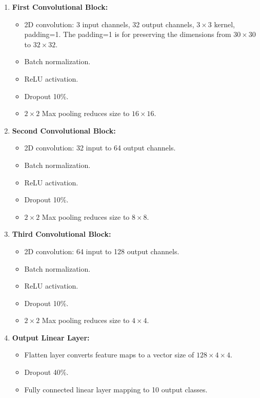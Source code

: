 \documentclass{report}
\begin{document}
\begin{enumerate}
    \item \textbf{First Convolutional Block:}
    \begin{itemize}
        \item 2D convolution: 3 input channels, 32 output channels, $3\times3$ kernel, padding=1. The padding=1 is 
              for preserving the dimensions from $30\times30$ to $32\times32$.
        \item Batch normalization.
        \item ReLU activation.
        \item Dropout 10\%.
        \item $2\times2$ Max pooling reduces size to $16\times16$.
    \end{itemize}
    \item \textbf{Second Convolutional Block:}
    \begin{itemize}
        \item 2D convolution: 32 input to 64 output channels.
        \item Batch normalization.
        \item ReLU activation.
        \item Dropout 10\%.
        \item $2\times2$ Max pooling reduces size to $8\times8$.
    \end{itemize}
    \item \textbf{Third Convolutional Block:}
    \begin{itemize}
        \item 2D convolution: 64 input to 128 output channels.
        \item Batch normalization.
        \item ReLU activation.
        \item Dropout 10\%.
        \item $2\times2$ Max pooling reduces size to $4\times4$.
    \end{itemize}
    \item \textbf{Output Linear Layer:}
    \begin{itemize}
        \item Flatten layer converts feature maps to a vector size of $128\times4\times4$.
        \item Dropout 40\%.
        \item Fully connected linear layer mapping to 10 output classes.
    \end{itemize}
\end{enumerate}
\end{document}
